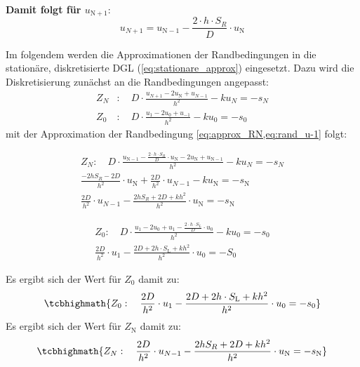 \begin{qed}
	\textbf{Damit folgt für $u_{\mathrm{N}+1}$}:
	\begin{equation}\label{eq:approx_RN}
		u_{N+1} =u_{\mathrm{N}-1} -\frac{2\cdot h\cdot S_R}{D} \cdot u_\mathrm{N} 
	\end{equation}
\end{qed}


Im folgendem werden die Approximationen der Randbedingungen in die stationäre, diskretisierte DGL (\cref{eq:stationare_approx}) eingesetzt. Dazu wird die Diskretisierung zunächst an die Randbedingungen angepasst:
\begin{equation}
	\begin{split}
		Z_N&: \quad	D\cdot \frac{u_{N+1}-2u_\mathrm{N}+u_{N-1}}{h^2}-ku_N=-s_N \\
		Z_0&: \quad D\cdot \frac{u_{1}-2u_0+u_{-1}}{h^2}-ku_0=-s_0
	\end{split}
\end{equation}
mit der Approximation der Randbedingung \cref{eq:approx_RN,eq:rand_u-1} folgt:

	\begin{equation}
		\begin{split}
				Z_N: \quad	D\cdot \frac{u_{\mathrm{N}-1}-\frac{2\cdot h\cdot S_R}{D} \cdot u_\mathrm{N}  -2u_\mathrm{N}+u_{\mathrm{N}-1}}{h^2}-ku_N=-s_N \\
					\frac{-2hS_R-2D}{h^2}\cdot u_\mathrm{N}+\frac{2D}{h^2}\cdot u_{N-1}-ku_\mathrm{N}=-s_\mathrm{N}\\
						\frac{2D}{h^2}\cdot u_{N-1}-\frac{2hS_R+2D+kh^2}{h^2}\cdot u_\mathrm{N}=-s_\mathrm{N}
		\end{split}
	\end{equation}

	\begin{equation}
	\begin{split}
		Z_0: \quad	D\cdot \frac{u_1-2u_0+u_1-\frac{2\cdot h\cdot S_L}{D} \cdot u_0 }{h^2}-ku_0=-s_0\\
		\frac{2D}{h^2}\cdot u_1 - \frac{2D+2h\cdot S_\mathrm{L}+kh^2}{h^2}\cdot u_0=-S_0
	\end{split}
\end{equation}

\begin{qed}
		Es ergibt sich der Wert für $Z_0$ damit zu:
	\begin{equation}
		\tcbhighmath{Z_0: \quad \frac{2D}{h^2}\cdot u_1 - \frac{2D+2h\cdot S_\mathrm{L}+kh^2}{h^2}\cdot u_0=-s_0}
	\end{equation}
	Es ergibt sich der Wert für $Z_\mathrm{N}$ damit zu:
	\begin{equation}
	\tcbhighmath{Z_N: \quad	\frac{2D}{h^2}\cdot u_{N-1}-\frac{2hS_R+2D+kh^2}{h^2}\cdot u_\mathrm{N}=-s_\mathrm{N}}
	\end{equation}

\end{qed}



